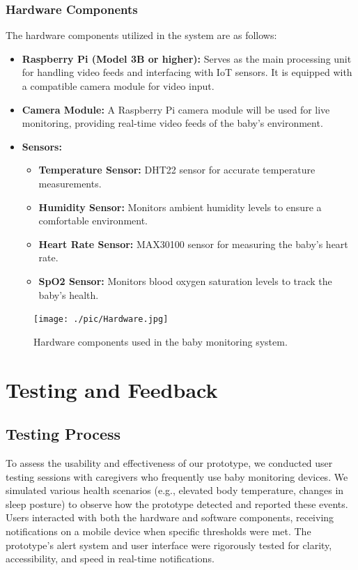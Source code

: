 \documentclass[12pt,a4paper]{report}
\begin{document}
\subsection{Hardware Components}
The hardware components utilized in the system are as follows:

\begin{itemize}
  \item \textbf{Raspberry Pi (Model 3B or higher):} Serves as the main processing unit for handling video feeds and interfacing with IoT sensors. It is equipped with a compatible camera module for video input.
  
  \item \textbf{Camera Module:} A Raspberry Pi camera module will be used for live monitoring, providing real-time video feeds of the baby’s environment.

  \item \textbf{Sensors:}
  \begin{itemize}
    \item \textbf{Temperature Sensor:} DHT22 sensor for accurate temperature measurements.
    \item \textbf{Humidity Sensor:} Monitors ambient humidity levels to ensure a comfortable environment.
    \item \textbf{Heart Rate Sensor:} MAX30100 sensor for measuring the baby's heart rate.
    \item \textbf{SpO2 Sensor:} Monitors blood oxygen saturation levels to track the baby's health.
  \end{itemize}
\end{itemize}

\begin{figure}[H]
  \centering
  \texttt{[image: ./pic/Hardware.jpg]}
  \caption{Hardware components used in the baby monitoring system.}
  \label{fig:hardware}
\end{figure}


\chapter{Testing and Feedback}
\section{Testing Process}
To assess the usability and effectiveness of our prototype, we conducted user testing sessions with caregivers who frequently use baby monitoring devices. We simulated various health scenarios (e.g., elevated body temperature, changes in sleep posture) to observe how the prototype detected and reported these events. Users interacted with both the hardware and software components, receiving notifications on a mobile device when specific thresholds were met. The prototype’s alert system and user interface were rigorously tested for clarity, accessibility, and speed in real-time notifications.
\end{document}
